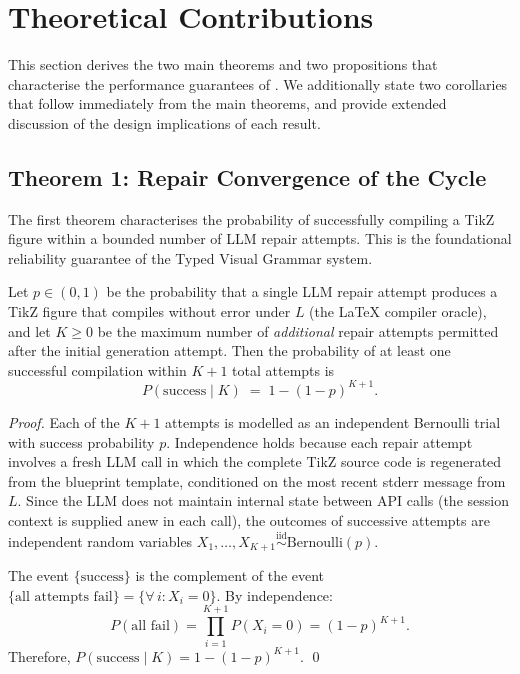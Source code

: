 \section{Theoretical Contributions}
\label{sec:contributions}

This section derives the two main theorems and two propositions that characterise the
performance guarantees of \sys{}.
We additionally state two corollaries that follow immediately from the main theorems,
and provide extended discussion of the design implications of each result.

\subsection{Theorem 1: Repair Convergence of the \tvg{} Cycle}

The first theorem characterises the probability of successfully compiling a TikZ figure
within a bounded number of LLM repair attempts.
This is the foundational reliability guarantee of the Typed Visual Grammar system.

\begin{theorem}
\label{thm:repair}
Let $p\in(0,1)$ be the probability that a single LLM repair attempt produces a
TikZ figure that compiles without error under $L$ (the \LaTeX{} compiler oracle),
and let $K\geq 0$ be the maximum number of \emph{additional} repair attempts
permitted after the initial generation attempt.
Then the probability of at least one successful compilation within $K+1$ total attempts is
\[
  P(\mathrm{success}\mid K) \;=\; 1 - (1-p)^{K+1}.
\]
\end{theorem}

\begin{proof}
Each of the $K+1$ attempts is modelled as an independent Bernoulli trial with success
probability $p$.
Independence holds because each repair attempt involves a fresh LLM call in which
the complete TikZ source code is regenerated from the blueprint template, conditioned
on the most recent stderr message from $L$.
Since the LLM does not maintain internal state between API calls (the session context
is supplied anew in each call), the outcomes of successive attempts are independent
random variables $X_1,\ldots,X_{K+1}\stackrel{\mathrm{iid}}{\sim}\mathrm{Bernoulli}(p)$.

The event $\{\mathrm{success}\}$ is the complement of the event $\{\text{all attempts
fail}\} = \{\forall\, i: X_i=0\}$.
By independence:
\[
  P(\text{all fail}) = \prod_{i=1}^{K+1}P(X_i=0) = (1-p)^{K+1}.
\]
Therefore, $P(\mathrm{success}\mid K) = 1 - (1-p)^{K+1}$. \qed
\end{proof}

